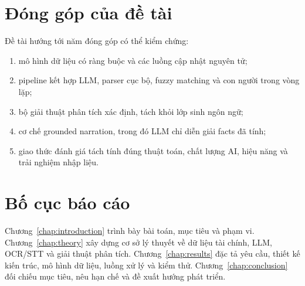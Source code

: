 \section{Đóng góp của đề tài}

Đề tài hướng tới năm đóng góp có thể kiểm chứng:

\begin{enumerate}
  \item mô hình dữ liệu có ràng buộc và các luồng cập nhật nguyên tử;
  \item pipeline kết hợp LLM, parser cục bộ, fuzzy matching và con người trong vòng lặp;
  \item bộ giải thuật phân tích xác định, tách khỏi lớp sinh ngôn ngữ;
  \item cơ chế grounded narration, trong đó LLM chỉ diễn giải facts đã tính;
  \item giao thức đánh giá tách tính đúng thuật toán, chất lượng AI, hiệu năng và trải nghiệm nhập liệu.
\end{enumerate}

\section{Bố cục báo cáo}

Chương~\ref{chap:introduction} trình bày bài toán, mục tiêu và phạm vi. Chương~\ref{chap:theory} xây dựng cơ sở lý thuyết về dữ liệu tài chính, LLM, OCR/STT và giải thuật phân tích. Chương~\ref{chap:results} đặc tả yêu cầu, thiết kế kiến trúc, mô hình dữ liệu, luồng xử lý và kiểm thử. Chương~\ref{chap:conclusion} đối chiếu mục tiêu, nêu hạn chế và đề xuất hướng phát triển.
